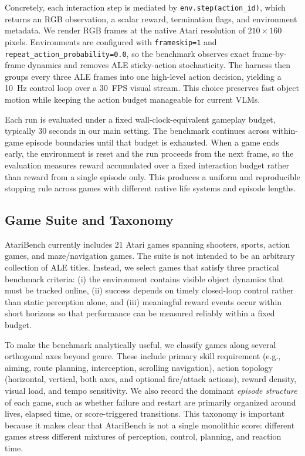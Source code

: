 Concretely, each interaction step is mediated by \texttt{env.step(action\_id)}, which returns an RGB observation, a scalar reward, termination flags, and environment metadata. We render RGB frames at the native Atari resolution of $210\times160$ pixels. Environments are configured with \texttt{frameskip=1} and \texttt{repeat\_action\_probability=0.0}, so the benchmark observes exact frame-by-frame dynamics and removes ALE sticky-action stochasticity. The harness then groups every three ALE frames into one high-level action decision, yielding a 10~Hz control loop over a 30~FPS visual stream. This choice preserves fast object motion while keeping the action budget manageable for current VLMs.

Each run is evaluated under a fixed wall-clock-equivalent gameplay budget, typically 30 seconds in our main setting. The benchmark continues across within-game episode boundaries until that budget is exhausted. When a game ends early, the environment is reset and the run proceeds from the next frame, so the evaluation measures reward accumulated over a fixed interaction budget rather than reward from a single episode only. This produces a uniform and reproducible stopping rule across games with different native life systems and episode lengths.

\subsection{Game Suite and Taxonomy}

AtariBench currently includes 21 Atari games spanning shooters, sports, action games, and maze/navigation games. The suite is not intended to be an arbitrary collection of ALE titles. Instead, we select games that satisfy three practical benchmark criteria: (i) the environment contains visible object dynamics that must be tracked online, (ii) success depends on timely closed-loop control rather than static perception alone, and (iii) meaningful reward events occur within short horizons so that performance can be measured reliably within a fixed budget.

To make the benchmark analytically useful, we classify games along several orthogonal axes beyond genre. These include primary skill requirement (e.g., aiming, route planning, interception, scrolling navigation), action topology (horizontal, vertical, both axes, and optional fire/attack actions), reward density, visual load, and tempo sensitivity. We also record the dominant \emph{episode structure} of each game, such as whether failure and restart are primarily organized around lives, elapsed time, or score-triggered transitions. This taxonomy is important because it makes clear that AtariBench is not a single monolithic score: different games stress different mixtures of perception, control, planning, and reaction time.

